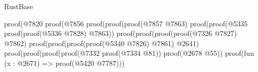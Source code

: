 \begin{lexlean}{RustBase}
\begin{coremodule}
                                                                          proof(@7820
                                                                              proof(@7856
                                                                                  proof(proof(proof(@7857
                                                                                          @7863)
                                                                                        proof(proof(@5335
                                                                                              proof(proof(@5336
                                                                                                    @7828)
                                                                                                  @7863))
                                                                                            proof(proof(proof(proof(@7326
                                                                                                      @7827)
                                                                                                    @7862)
                                                                                                  proof(proof(proof(proof(@5340
                                                                                                            @7826)
                                                                                                          @7861)
                                                                                                        @2641)
                                                                                                      proof(proof(proof(proof(@7332
                                                                                                                proof(@7334
                                                                                                                    @81))
                                                                                                              proof(@2678
                                                                                                                  @55))
                                                                                                            proof(fun (x : @2671) =>
                                                                                                              proof(@5420
                                                                                                                  @7787)))

\end{coremodule}
\end{lexlean}
